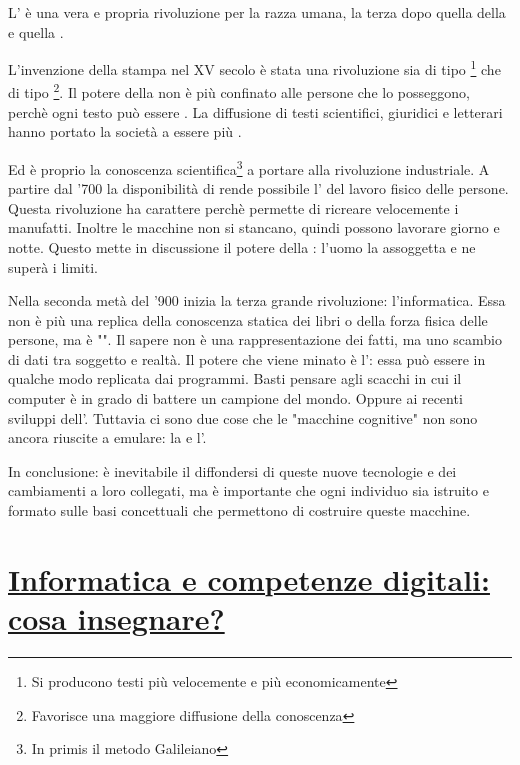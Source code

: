 L' è una vera e propria rivoluzione per la razza umana, la terza dopo quella della  e quella .

L'invenzione della stampa nel XV secolo è stata una rivoluzione sia di tipo \footnote{Si producono testi più velocemente e più economicamente} che di tipo \footnote{Favorisce una maggiore diffusione della conoscenza}. Il potere della  non è più confinato alle persone che lo posseggono, perchè ogni testo può essere . La diffusione di testi scientifici, giuridici e letterari hanno portato la società a essere più .

Ed è proprio la conoscenza scientifica\footnote{In primis il metodo Galileiano} a portare alla rivoluzione industriale. A partire dal '700 la disponibilità di  rende possibile l' del lavoro fisico delle persone. Questa rivoluzione ha carattere  perchè permette di ricreare velocemente i manufatti. Inoltre le macchine non si stancano, quindi possono lavorare giorno e notte. Questo mette in discussione il potere della : l'uomo la assoggetta e ne superà i limiti.

Nella seconda metà del '900 inizia la terza grande rivoluzione: l'informatica. Essa non è più una replica della conoscenza statica dei libri o della forza fisica delle persone, ma è "". Il sapere non è una rappresentazione  dei fatti, ma uno scambio di dati  tra soggetto e realtà. Il potere che viene minato è l': essa può essere in qualche modo replicata dai programmi. Basti pensare agli scacchi in cui il computer è in grado di battere un campione del mondo. Oppure ai recenti sviluppi dell'. Tuttavia ci sono due cose che le "macchine cognitive" non sono ancora riuscite a emulare: la  e l'.

In conclusione: è inevitabile il diffondersi di queste nuove tecnologie e dei cambiamenti a loro collegati, ma è importante che ogni individuo sia istruito e formato sulle basi concettuali che permettono di costruire queste macchine.

\pagebreak


\section{\href{https://link-and-think.blogspot.com/2019/03/informatica-e-competenze-digitali-cosa.html}{Informatica e competenze digitali: cosa insegnare?}}

